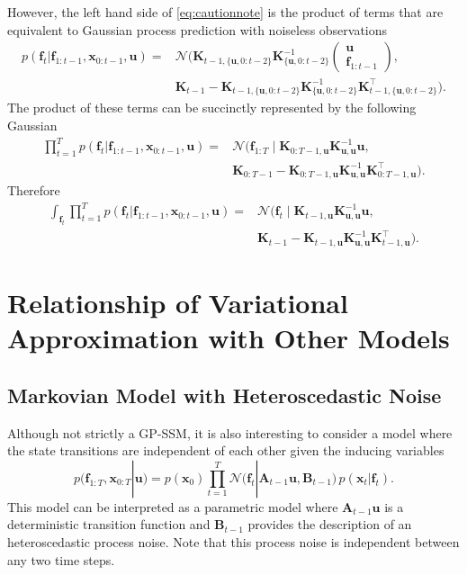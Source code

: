 \documentclass{article} %
\newcommand{\n}[1]{\mathbf{#1}}
\newcommand{\x}{\mathbf{x}}
\begin{document}
However, the left hand side of \eqref{eq:cautionnote} is the product of terms that are equivalent to Gaussian process prediction with noiseless observations
\begin{align}
	p(\n{f}_t | \n{f}_{1:t-1},\x_{0:t-1},\n{u}) =& \mathcal{N}\big(\n{K}_{t-1,\{\n{u},0:t-2\}}  \n{K}_{\{\n{u},0:t-2\}}^{-1}  \begin{pmatrix} \n{u} \\ \n{f}_{1:t-1} \end{pmatrix}    , \nonumber \\ 
	 & \n{K}_{t-1} -  \n{K}_{t-1,\{\n{u},0:t-2\}}  \n{K}_{\{\n{u},0:t-2\}}^{-1}  \n{K}_{t-1,\{\n{u},0:t-2\}}^\top \big).
\end{align}
The product of these terms can be succinctly represented by the following Gaussian
\begin{align}
	\prod_{t=1}^T p(\n{f}_t | \n{f}_{1:t-1},\x_{0:t-1},\n{u}) =& \mathcal{N}\big( \n{f}_{1:T} \mid  \n{K}_{0:T-1,\n{u}}  \n{K}_{\n{u},\n{u}}^{-1}   \n{u}   ,  \nonumber \\ 
	 & \n{K}_{0:T-1} - \n{K}_{0:T-1,\n{u}}  \n{K}_{\n{u},\n{u}}^{-1} \n{K}_{0:T-1,\n{u}}^\top  \big) .
\end{align}
Therefore
\begin{align}
	\int_{\n{f}_t} \prod_{t=1}^T p(\n{f}_t | \n{f}_{1:t-1},\x_{0:t-1},\n{u}) =& \mathcal{N}\big( \n{f}_{t} \mid  \n{K}_{t-1,\n{u}}  \n{K}_{\n{u},\n{u}}^{-1}   \n{u}   ,  \nonumber \\ 
	 & \n{K}_{t-1} - \n{K}_{t-1,\n{u}}  \n{K}_{\n{u},\n{u}}^{-1} \n{K}_{t-1,\n{u}}^\top  \big) .
\end{align}


\section{Relationship of Variational Approximation with Other Models}

\subsection{Markovian Model with Heteroscedastic Noise}
\label{sec:markovianmodel}

Although not strictly a GP-SSM, it is also interesting to consider a model where the state transitions are independent of each other given the inducing variables
\begin{equation}
	 p(\n{f}_{1:T} ,\x_{0:T} |  \n{u})  = p(\x_0) \prod_{t=1}^T \mathcal{N}\big(\n{f}_t | \n{A}_{t-1} \n{u}, \n{B}_{t-1} \big) \,  p(\x_t | \n{f}_t) .
\end{equation}
This model can be interpreted as a parametric model where $\n{A}_{t-1} \n{u}$ is a deterministic transition function and $\n{B}_{t-1}$ provides the description of an heteroscedastic process noise. Note that this process noise is independent between any two time steps.
\end{document}
